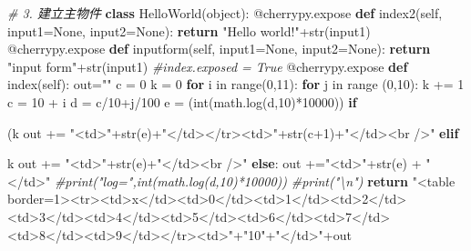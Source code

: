 \documentclass[]{article}
\newenvironment{Shaded}{}{}
\newcommand{\KeywordTok}[1]{\textcolor[rgb]{0.00,0.44,0.13}{\textbf{{#1}}}}
\newcommand{\DataTypeTok}[1]{\textcolor[rgb]{0.56,0.13,0.00}{{#1}}}
\newcommand{\DecValTok}[1]{\textcolor[rgb]{0.25,0.63,0.44}{{#1}}}
\newcommand{\StringTok}[1]{\textcolor[rgb]{0.25,0.44,0.63}{{#1}}}
\newcommand{\CommentTok}[1]{\textcolor[rgb]{0.38,0.63,0.69}{\textit{{#1}}}}
\newcommand{\OtherTok}[1]{\textcolor[rgb]{0.00,0.44,0.13}{{#1}}}
\newcommand{\NormalTok}[1]{{#1}}
\begin{document}
\begin{Shaded}
\begin{Highlighting}[]
\CommentTok{# 3. 建立主物件}
\KeywordTok{class} \NormalTok{HelloWorld(}\DataTypeTok{object}\NormalTok{):}
    \OtherTok{@cherrypy.expose}
    \KeywordTok{def} \NormalTok{index2(}\OtherTok{self}\NormalTok{, input1=}\OtherTok{None}\NormalTok{, input2=}\OtherTok{None}\NormalTok{):}
        \KeywordTok{return} \StringTok{"Hello world!"}\NormalTok{+}\DataTypeTok{str}\NormalTok{(input1)}
    \OtherTok{@cherrypy.expose}
    \KeywordTok{def} \NormalTok{inputform(}\OtherTok{self}\NormalTok{, input1=}\OtherTok{None}\NormalTok{, input2=}\OtherTok{None}\NormalTok{):}
        \KeywordTok{return} \StringTok{"input form"}\NormalTok{+}\DataTypeTok{str}\NormalTok{(input1)}
    \CommentTok{#index.exposed = True}
    \OtherTok{@cherrypy.expose}
    \KeywordTok{def} \NormalTok{index(}\OtherTok{self}\NormalTok{):}
        \NormalTok{out=}\StringTok{""}
        \NormalTok{c = }\DecValTok{0}
        \NormalTok{k = }\DecValTok{0}
        \KeywordTok{for} \NormalTok{i in }\DataTypeTok{range}\NormalTok{(}\DecValTok{0}\NormalTok{,}\DecValTok{11}\NormalTok{):}
            \KeywordTok{for} \NormalTok{j in }\DataTypeTok{range} \NormalTok{(}\DecValTok{0}\NormalTok{,}\DecValTok{10}\NormalTok{):}
                \NormalTok{k += }\DecValTok{1}
                \NormalTok{c = }\DecValTok{10} \NormalTok{+ i}
                \NormalTok{d = c/}\DecValTok{10}\NormalTok{+j/}\DecValTok{100}
                \NormalTok{e = (}\DataTypeTok{int}\NormalTok{(math.log(d,}\DecValTok{10}\NormalTok{)*}\DecValTok{10000}\NormalTok{))}
                \KeywordTok{if} \NormalTok{(k%
                    \NormalTok{out += }\StringTok{"<td>"}\NormalTok{+}\DataTypeTok{str}\NormalTok{(e)+}\StringTok{"</td></tr><td>"}\NormalTok{+}\DataTypeTok{str}\NormalTok{(c}\DecValTok{+1}\NormalTok{)+}\StringTok{"</td><br />"}
                \KeywordTok{elif} \NormalTok{k%
                    \NormalTok{out += }\StringTok{"<td>"}\NormalTok{+}\DataTypeTok{str}\NormalTok{(e)+}\StringTok{"</td><br />"}
                \KeywordTok{else}\NormalTok{:}
                    \NormalTok{out +=}\StringTok{"<td>"}\NormalTok{+}\DataTypeTok{str}\NormalTok{(e) + }\StringTok{"</td>"}
                \CommentTok{#print("log=",int(math.log(d,10)*10000))}
            \CommentTok{#print("\textbackslash{}n")}
        \KeywordTok{return} \StringTok{"<table border=1><tr><td>x</td><td>0</td><td>1</td><td>2</td><td>3</td><td>4</td><td>5</td><td>6</td><td>7</td><td>8</td><td>9</td></tr><td>"}\NormalTok{+}\StringTok{"10"}\NormalTok{+}\StringTok{"</td>"}\NormalTok{+out}
 
}}
\end{Highlighting}
\end{Shaded}
\end{document}
